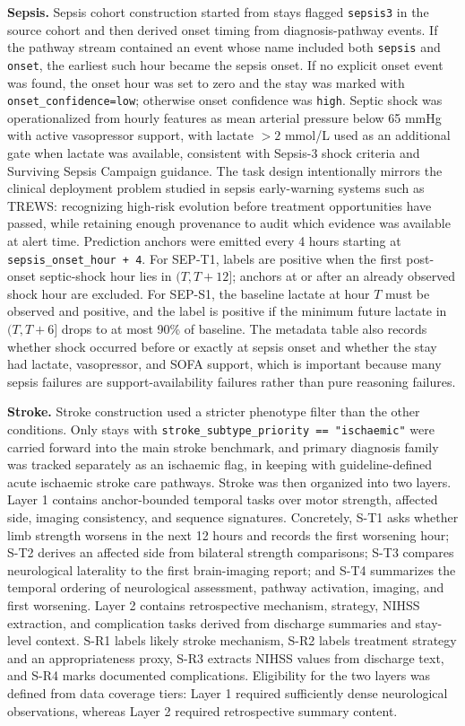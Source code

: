\documentclass[pdflatex,sn-nature]{sn-jnl}
\begin{document}
\noindent\textbf{Sepsis.} Sepsis cohort construction started from stays flagged \texttt{sepsis3} in the source cohort and then derived onset timing from diagnosis-pathway events. If the pathway stream contained an event whose name included both \texttt{sepsis} and \texttt{onset}, the earliest such hour became the sepsis onset. If no explicit onset event was found, the onset hour was set to zero and the stay was marked with \texttt{onset\_confidence=low}; otherwise onset confidence was \texttt{high}. Septic shock was operationalized from hourly features as mean arterial pressure below 65 mmHg with active vasopressor support, with lactate $>2$ mmol/L used as an additional gate when lactate was available, consistent with Sepsis-3 shock criteria and Surviving Sepsis Campaign guidance\cite{singer2016sepsis3,evans2021surviving}. The task design intentionally mirrors the clinical deployment problem studied in sepsis early-warning systems such as TREWS: recognizing high-risk evolution before treatment opportunities have passed, while retaining enough provenance to audit which evidence was available at alert time\cite{adams2022trews}. Prediction anchors were emitted every 4 hours starting at \texttt{sepsis\_onset\_hour + 4}. For SEP-T1, labels are positive when the first post-onset septic-shock hour lies in $(T, T+12]$; anchors at or after an already observed shock hour are excluded. For SEP-S1, the baseline lactate at hour $T$ must be observed and positive, and the label is positive if the minimum future lactate in $(T, T+6]$ drops to at most 90\% of baseline. The metadata table also records whether shock occurred before or exactly at sepsis onset and whether the stay had lactate, vasopressor, and SOFA support, which is important because many sepsis failures are support-availability failures rather than pure reasoning failures.

\noindent\textbf{Stroke.} Stroke construction used a stricter phenotype filter than the other conditions. Only stays with \texttt{stroke\_subtype\_priority == "ischaemic"} were carried forward into the main stroke benchmark, and primary diagnosis family was tracked separately as an ischaemic flag, in keeping with guideline-defined acute ischaemic stroke care pathways\cite{berge2021eso}. Stroke was then organized into two layers. Layer 1 contains anchor-bounded temporal tasks over motor strength, affected side, imaging consistency, and sequence signatures. Concretely, S-T1 asks whether limb strength worsens in the next 12 hours and records the first worsening hour; S-T2 derives an affected side from bilateral strength comparisons; S-T3 compares neurological laterality to the first brain-imaging report; and S-T4 summarizes the temporal ordering of neurological assessment, pathway activation, imaging, and first worsening. Layer 2 contains retrospective mechanism, strategy, NIHSS extraction, and complication tasks derived from discharge summaries and stay-level context. S-R1 labels likely stroke mechanism, S-R2 labels treatment strategy and an appropriateness proxy, S-R3 extracts NIHSS values from discharge text, and S-R4 marks documented complications. Eligibility for the two layers was defined from data coverage tiers: Layer 1 required sufficiently dense neurological observations, whereas Layer 2 required retrospective summary content.
\end{document}
